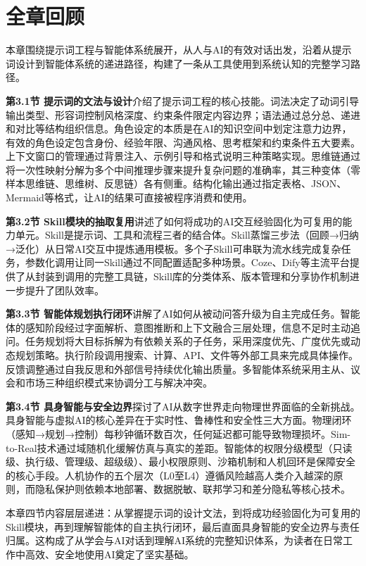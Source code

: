 \section*{全章回顾}

本章围绕提示词工程与智能体系统展开，从人与AI的有效对话出发，沿着从提示词设计到智能体系统的递进路径，构建了一条从工具使用到系统认知的完整学习路径。

\textbf{第3.1节 提示词的文法与设计}介绍了提示词工程的核心技能。词法决定了动词引导输出类型、形容词控制风格深度、约束条件限定内容边界；语法通过总分总、递进和对比等结构组织信息。角色设定的本质是在AI的知识空间中划定注意力边界，有效的角色设定包含身份、经验年限、沟通风格、思考框架和约束条件五大要素。上下文窗口的管理通过背景注入、示例引导和格式说明三种策略实现。思维链通过将一次性映射分解为多个中间推理步骤来提升复杂问题的准确率，其三种变体（零样本思维链、思维树、反思链）各有侧重。结构化输出通过指定表格、JSON、Mermaid等格式，让AI的结果可直接被程序消费和使用。

\textbf{第3.2节 Skill模块的抽取复用}讲述了如何将成功的AI交互经验固化为可复用的能力单元。Skill是提示词、工具和流程三者的结合体。Skill蒸馏三步法（回顾→归纳→泛化）从日常AI交互中提炼通用模板。多个子Skill可串联为流水线完成复杂任务，参数化调用让同一Skill通过不同配置适配多种场景。Coze、Dify等主流平台提供了从封装到调用的完整工具链，Skill库的分类体系、版本管理和分享协作机制进一步提升了团队效率。

\textbf{第3.3节 智能体规划执行闭环}讲解了AI如何从被动问答升级为自主完成任务。智能体的感知阶段经过字面解析、意图推断和上下文融合三层处理，信息不足时主动追问。任务规划将大目标拆解为有依赖关系的子任务，采用深度优先、广度优先或动态规划策略。执行阶段调用搜索、计算、API、文件等外部工具来完成具体操作。反馈调整通过自我反思和外部信号持续优化输出质量。多智能体系统采用主从、议会和市场三种组织模式来协调分工与解决冲突。

\textbf{第3.4节 具身智能与安全边界}探讨了AI从数字世界走向物理世界面临的全新挑战。具身智能与虚拟AI的核心差异在于实时性、鲁棒性和安全性三大方面。物理闭环（感知→规划→控制）每秒钟循环数百次，任何延迟都可能导致物理损坏。Sim-to-Real技术通过域随机化缓解仿真与真实的差距。智能体的权限分级模型（只读级、执行级、管理级、超级级）、最小权限原则、沙箱机制和人机回环是保障安全的核心手段。人机协作的五个层次（L0至L4）遵循风险越高人类介入越深的原则，而隐私保护则依赖本地部署、数据脱敏、联邦学习和差分隐私等核心技术。

本章四节内容层层递进：从掌握提示词的设计文法，到将成功经验固化为可复用的Skill模块，再到理解智能体的自主执行闭环，最后直面具身智能的安全边界与责任归属。这构成了从学会与AI对话到理解AI系统的完整知识体系，为读者在日常工作中高效、安全地使用AI奠定了坚实基础。


